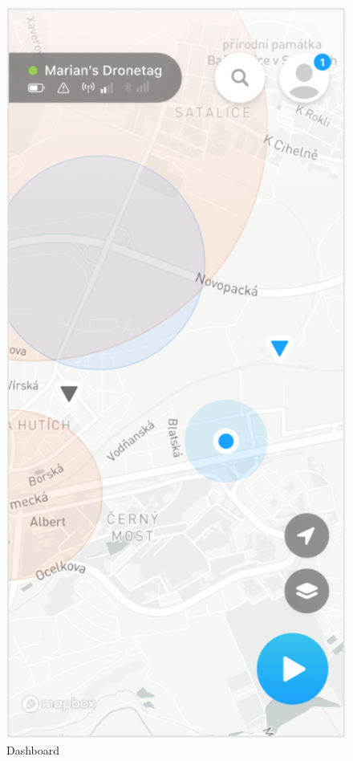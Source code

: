 \begin{figure}
    \centering
    \begin{minipage}{.4\textwidth}
        \centering
        \includegraphics[width=.7\linewidth]{assets/user_interface_design/dashboard/dashboard.png}
        \caption{Dashboard}
        \label{fig:dashboard}
    \end{minipage}%
    \hspace{.05\linewidth}
    \begin{minipage}{.4\textwidth}
        \centering

\end{minipage}
\end{figure}
